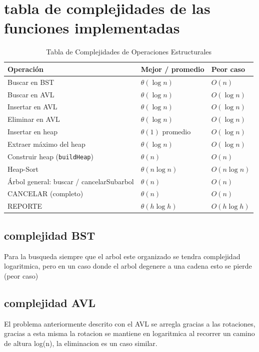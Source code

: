 \documentclass[conference,onecolumn]{IEEEtran}
\begin{document}
\section{tabla de complejidades de las funciones implementadas}
\begin{table}[h!]
\centering
\caption{Tabla de Complejidades de Operaciones Estructurales}
\label{tab:complejidades}
\begin{tabular}{lll}
\toprule
\textbf{Operación} & \textbf{Mejor / promedio} & \textbf{Peor caso} \\
\midrule
Buscar en BST & $\theta(\log n)$ & $O(n)$ \\
Buscar en AVL & $\theta(\log n)$ & $O(\log n)$ \\
Insertar en AVL & $\theta(\log n)$ & $O(\log n)$ \\
\addlinespace %
Eliminar en AVL & $\theta(\log n)$ & $O(\log n)$ \\
Insertar en heap & $\theta(1)$ promedio & $O(\log n)$ \\
Extraer máximo del heap & $\theta(\log n)$ & $O(\log n)$ \\
Construir heap (\texttt{buildHeap}) & $\theta(n)$ & $O(n)$ \\
Heap-Sort & $\theta(n \log n)$ & $O(n \log n)$ \\
\addlinespace
Árbol general: buscar / cancelarSubarbol & $\theta(n)$ & $O(n)$ \\
CANCELAR (completo) & $\theta(n)$ & $O(n)$ \\
REPORTE & $\theta(h \log h)$ & $O(h \log h)$ \\
\bottomrule
\end{tabular}
\end{table}
\subsection{complejidad BST}
Para la busqueda siempre que el arbol este organizado se tendra complejidad logaritmica, pero en un caso donde el arbol degenere a una cadena esto se pierde (peor caso)
\subsection{complejidad AVL}
El problema anteriormente descrito con el AVL se arregla gracias a las rotaciones, gracias a esta misma la rotacion se mantiene en logaritmica al recorrer un camino de altura log(n), la eliminacion es un caso similar.
\end{document}
